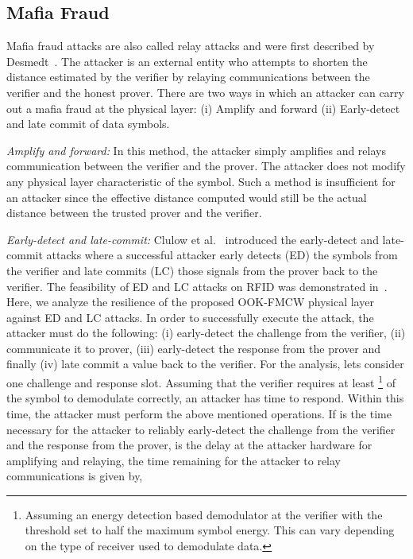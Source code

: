 \documentclass{sig-alternate-10pt}
\begin{document}
\subsection{Mafia Fraud}
\label{subsec:mafia-fraud}

Mafia fraud attacks are also called relay attacks and were first described by
Desmedt~\cite{DesmedtAug87}. The attacker is an external entity who attempts to
shorten the distance estimated by the verifier by relaying communications
between the verifier and the honest prover. There are two ways in which an
attacker can carry out a mafia fraud at the physical layer: (i) Amplify and
forward (ii) Early-detect and late commit of data symbols.

\emph{Amplify and forward:} In this method, the attacker simply amplifies and
relays communication between the verifier and the prover. The attacker does
not modify any physical layer characteristic of the symbol. Such a method is
insufficient for an attacker since the effective distance computed would still
be the actual distance between the trusted prover and the verifier.

\emph{Early-detect and late-commit:} Clulow et al.~\cite{ClulowSep06} introduced
the early-detect and late-commit attacks where a successful attacker early
detects (ED) the symbols from the verifier and late commits (LC) those signals
from the prover back to the verifier. The feasibility of ED and LC attacks on
RFID was demonstrated in~\cite{HanckeApr08}. Here, we analyze the resilience of
the proposed OOK-FMCW physical layer against ED and LC attacks. In order to
successfully execute the attack, the attacker must do the following: (i)
early-detect the challenge from the verifier, (ii) communicate it to prover,
(iii) early-detect the response from the prover and finally (iv) late commit a
value back to the verifier. For the analysis, lets consider one challenge and
response slot. Assuming that the verifier requires at least
\footnote{Assuming an energy detection based demodulator at the verifier
  with the threshold set to half the maximum symbol energy. This can vary
  depending on the type of receiver used to demodulate data.} of the symbol to
demodulate correctly, an attacker has  time to respond. Within
this time, the attacker must perform the above mentioned operations. If 
is the time necessary for the attacker to reliably early-detect the challenge
from the verifier and the response from the prover,  is the delay at the
attacker hardware for amplifying and relaying, the time remaining for the
attacker to relay communications is given by,
\end{document}
